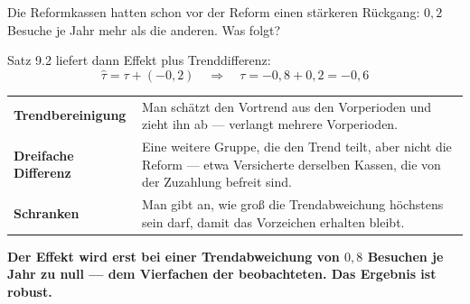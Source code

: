\begin{aufgabe}
Die Reformkassen hatten schon vor der Reform einen stärkeren Rückgang: $0{,}2$ Besuche je Jahr mehr als die anderen. Was folgt?

\loesung
{}
Satz 9.2 liefert dann Effekt plus Trenddifferenz:
\[ \hat\tau = \tau + (-0{,}2) \quad\Longrightarrow\quad \tau = -0{,}8+0{,}2 = -0{,}6 \]

\begin{center}
{\small
\renewcommand{\arraystretch}{1.5}
\begin{tabular}{@{}P{3.0cm}P{5.6cm}@{}}
\toprule
\textbf{Trendbereinigung} & Man schätzt den Vortrend aus den Vorperioden und zieht ihn ab --- verlangt mehrere Vorperioden.\\
\textbf{Dreifache Differenz} & Eine weitere Gruppe, die den Trend teilt, aber nicht die Reform --- etwa Versicherte derselben Kassen, die von der Zuzahlung befreit sind.\\
\textbf{Schranken} & Man gibt an, wie groß die Trendabweichung höchstens sein darf, damit das Vorzeichen erhalten bleibt.\\
\bottomrule
\end{tabular}}
\end{center}

\begin{center}
\begin{minipage}{0.9\textwidth}
\textbf{Der Effekt wird erst bei einer Trendabweichung von $0{,}8$ Besuchen je Jahr zu null --- dem Vierfachen der beobachteten. Das Ergebnis ist robust.}
\end{minipage}
\end{center}

\begin{center}
\begin{minipage}{0.88\textwidth}
\end{minipage}
\end{center}
\end{aufgabe}

